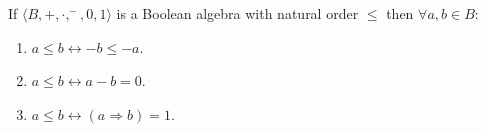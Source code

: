 If $\langle B, +, \cdot, ^-, 0, 1 \rangle$ is a Boolean algebra with natural order $\leq$ then $\forall a, b \in B$:
\begin{enumerate}
\item $a \leq b \leftrightarrow -b \leq -a$.
\item $a \leq b \leftrightarrow a - b = 0$.
\item $a \leq b \leftrightarrow (a \Rightarrow b) = 1$.
\end{enumerate}
